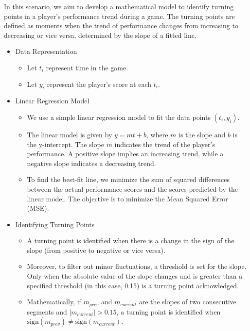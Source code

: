 \documentclass[UTF8]{mcmthesis}
\begin{document}
	In this scenario, we aim to develop a mathematical model to identify turning points in a player's performance trend during a game. The turning points are defined as moments when the trend of performance changes from increasing to decreasing or vice versa, determined by the slope of a fitted line. 
	
	\begin{itemize}
		\item Data Representation
		\begin{itemize}
			\item Let \( t_i \) represent time in the game.
			\item Let \( y_i \) represent the player's score at each \( t_i \).
		\end{itemize}
		\item Linear Regression Model
		\begin{itemize}
			\item We use a simple linear regression model to fit the data points \((t_i, y_i)\).
			\item The linear model is given by \( y = mt + b \), where \( m \) is the slope and \( b \) is the y-intercept. The slope \( m \) indicates the trend of the player's performance. A positive slope implies an increasing trend, while a negative slope indicates a decreasing trend.
			\item To find the best-fit line, we minimize the sum of squared differences between the actual performance scores and the scores predicted by the linear model. The objective is to minimize the Mean Squared Error (MSE).
		\end{itemize}		
		\item Identifying Turning Points
		\begin{itemize}
			\item A turning point is identified when there is a change in the sign of the slope (from positive to negative or vice versa).
			\item Moreover, to filter out minor fluctuations, a threshold is set for the slope. Only when the absolute value of the slope changes and is greater than a specified threshold (in this case, 0.15) is a turning point acknowledged.
			\item Mathematically, if \( m_{prev} \) and \( m_{current} \) are the slopes of two consecutive segments and \( |m_{current}| > 0.15 \), a turning point is identified when \( \text{sign}(m_{prev}) \neq \text{sign}(m_{current}) \).
		\end{itemize}
	\end{itemize}
	
\end{document}
